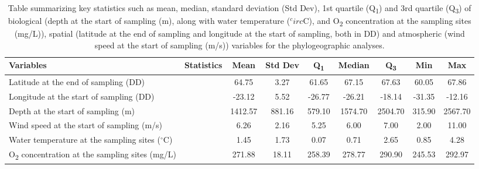\begin{table}[ht]
\centering
\renewcommand{\arraystretch}{1.2}
\begin{tabular}{|l|l|c|c|c|c|c|c|c|}
\hline
\textbf{Variables} & \textbf{Statistics} & \textbf{Mean} & \textbf{Std Dev} & \textbf{Q\textsubscript{1}} & \textbf{Median} & \textbf{Q\textsubscript{3}} & \textbf{Min} & \textbf{Max} \\ \hline
Latitude at the end of sampling (DD) & & 64.75 & 3.27 & 61.65 & 67.15 & 67.63 & 60.05 & 67.86 \\ 
Longitude at the start of sampling (DD) & & -23.12 & 5.52 & -26.77 & -26.21 & -18.14 & -31.35 & -12.16 \\ 
Depth at the start of sampling (m) & & 1412.57 & 881.16 & 579.10 & 1574.70 & 2504.70 & 315.90 & 2567.70 \\
Wind speed at the start of sampling (m/s) & & 6.26 & 2.16 & 5.25 & 6.00 & 7.00 & 2.00 & 11.00 \\ \hline
Water temperature at the sampling sites ($^\circ$C) & & 1.45 & 1.73 & 0.07 & 0.71 & 2.65 & 0.85 & 4.28 \\ 
O\textsubscript{2} concentration at the sampling sites (mg/L) & & 271.88 & 18.11 & 258.39 & 278.77 & 290.90 & 245.53 & 292.97 \\ 
\end{tabular}
\caption{Table summarizing key statistics such as mean, median, standard deviation (Std Dev), 1st quartile (Q\textsubscript{1}) and 3rd quartile (Q\textsubscript{3}) of biological (depth at the start of sampling (m), along with water temperature ($^circ$C), and O\textsubscript{2} concentration at the sampling sites (mg/L)), spatial (latitude at the end of sampling and longitude at the start of sampling, both in DD) and atmospheric (wind speed at the start of sampling (m/s)) variables for the phylogeographic analyses. \label{fig:tab1}}
\end{table}

